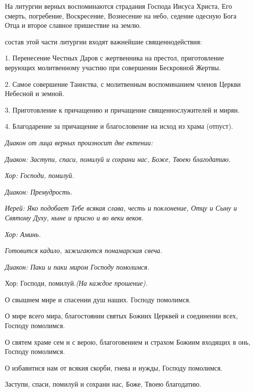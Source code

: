   На литургии верных воспоминаются страдания Господа Иисуса Христа, Его смерть, погребение, Воскресение, Вознесение на небо, седение одесную Бога Отца и второе славное пришествие на землю.


 состав этой части литургии входят важнейшие священнодействия:


  1. Перенесение Честных Даров с жертвенника на престол, приготовление верующих молитвенному участию при совершении Бескровной Жертвы.


  2. Самое совершение Таинства, с молитвенным воспоминанием членов Церкви Небесной и земной. 


  3. Приготовление к причащению и причащение священнослужителей и мирян.


  4. Благодарение за причащение и благословение на исход из храма (отпуст).




\itshape Диакон от лица верных произносит две ектении:\normalfont{}


 \itshape  Диакон:\normalfont{} Заступи, спаси, помилуй и сохрани нас, Боже, Твоею благодатию.


\itshape Хор:\normalfont{} Господи, помилуй.


\itshape Диакон:\normalfont{} Премудрость.


\itshape  Иерей:\normalfont{} Яко подобает Тебе всякая слава, честь и поклонение, Отцу и Сыну и Святому Духу, ныне и присно и во веки веков.


\itshape  Хор:\normalfont{} Аминь.


\itshape  Готовится кадило, зажигаются понамарская свеча.\normalfont{}


 \itshape  Диакон:\normalfont{} Паки и паки миром Господу помолимся. \itshape  


  Хор:\normalfont{} Господи, помилуй.\itshape  (На каждое прошение)\normalfont{}. 


  О свышнем мире и спасении душ наших. Господу помолимся. 


  О мире всего мира, благостоянии святых Божиих Церквей и соединении всех, Господу помолимся. 


  О святем храме сем и с верою, благоговением и страхом Божиим входящих в онь, Господу помолимся. 


  О избавитися нам от всякия скорби, гнева и нужды, Господу помолимся. 


  Заступи, спаси, помилуй и сохрани нас, Боже, Твоею благодатию. \itshape 


